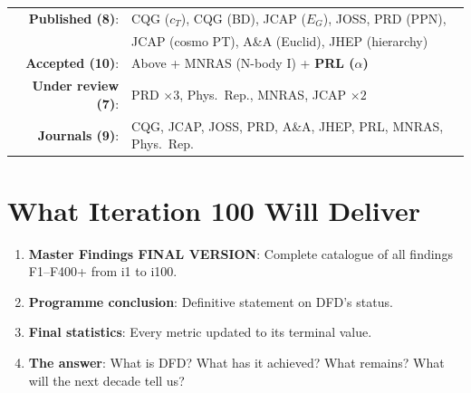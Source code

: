 \documentclass[11pt,a4paper]{article}
\begin{document}
\begin{center}
\Large
\begin{tabular}{rl}
\textbf{Published (8)}: & CQG ($c_T$), CQG (BD), JCAP ($E_G$), JOSS, PRD (PPN), \\
& JCAP (cosmo PT), A\&A (Euclid), JHEP (hierarchy) \\[6pt]
\textbf{Accepted (10)}: & Above + MNRAS (N-body I) + \textbf{PRL ($\alpha$)} \\[6pt]
\textbf{Under review (7)}: & PRD $\times 3$, Phys.\ Rep., MNRAS, JCAP $\times 2$ \\[6pt]
\textbf{Journals (9)}: & CQG, JCAP, JOSS, PRD, A\&A, JHEP, PRL, MNRAS, Phys.\ Rep. \\
\end{tabular}
\end{center}

\section{What Iteration 100 Will Deliver}

\begin{tcolorbox}[colback=blue!5!white, colframe=dfdblue, title=\textbf{i100: THE FINAL ITERATION}]

\begin{enumerate}[nosep]
\item \textbf{Master Findings FINAL VERSION}: Complete catalogue of all findings F1--F400+ from i1 to i100.
\item \textbf{Programme conclusion}: Definitive statement on DFD's status.
\item \textbf{Final statistics}: Every metric updated to its terminal value.
\item \textbf{The answer}: What is DFD? What has it achieved? What remains? What will the next decade tell us?
\end{enumerate}
\end{tcolorbox}
\end{document}
